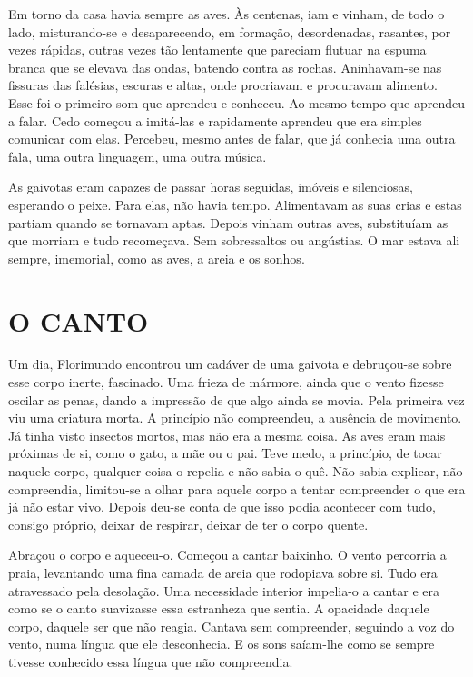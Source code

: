 Em torno da casa havia sempre as aves. Às centenas, iam e vinham, de
todo o lado, misturando-se e desaparecendo, em formação, desordenadas,
rasantes, por vezes rápidas, outras vezes tão lentamente que pareciam
flutuar na espuma branca que se elevava das ondas, batendo contra as
rochas. Aninhavam-se nas fissuras das falésias, escuras e altas, onde
procriavam e procuravam alimento. Esse foi o primeiro som que aprendeu e
conheceu. Ao mesmo tempo que aprendeu a falar. Cedo começou a imitá-las
e rapidamente aprendeu que era simples comunicar com elas. Percebeu,
mesmo antes de falar, que já conhecia uma outra fala, uma outra
linguagem, uma outra música.

As gaivotas eram capazes de passar horas seguidas, imóveis e
silenciosas, esperando o peixe. Para elas, não havia tempo. Alimentavam
as suas crias e estas partiam quando se tornavam aptas. Depois vinham
outras aves, substituíam as que morriam e tudo recomeçava. Sem
sobressaltos ou angústias. O mar estava ali sempre, imemorial, como as
aves, a areia e os sonhos.

\section{O CANTO}

Um dia, Florimundo encontrou um cadáver de uma gaivota e debruçou-se
sobre esse corpo inerte, fascinado. Uma frieza de mármore, ainda que o
vento fizesse oscilar as penas, dando a impressão de que algo ainda se
movia. Pela primeira vez viu uma criatura morta. A princípio não
compreendeu, a ausência de movimento. Já tinha visto insectos mortos,
mas não era a mesma coisa. As aves eram mais próximas de si, como o
gato, a mãe ou o pai. Teve medo, a princípio, de tocar naquele corpo,
qualquer coisa o repelia e não sabia o quê. Não sabia explicar, não
compreendia, limitou-se a olhar para aquele corpo a tentar compreender o
que era já não estar vivo. Depois deu-se conta de que isso podia
acontecer com tudo, consigo próprio, deixar de respirar, deixar de ter o
corpo quente.

Abraçou o corpo e aqueceu-o. Começou a cantar baixinho. O vento
percorria a praia, levantando uma fina camada de areia que rodopiava
sobre si. Tudo era atravessado pela desolação. Uma necessidade interior
impelia-o a cantar e era como se o canto suavizasse essa estranheza que
sentia. A opacidade daquele corpo, daquele ser que não reagia. Cantava
sem compreender, seguindo a voz do vento, numa língua que ele
desconhecia. E os sons saíam-lhe como se sempre tivesse conhecido essa
língua que não compreendia.


